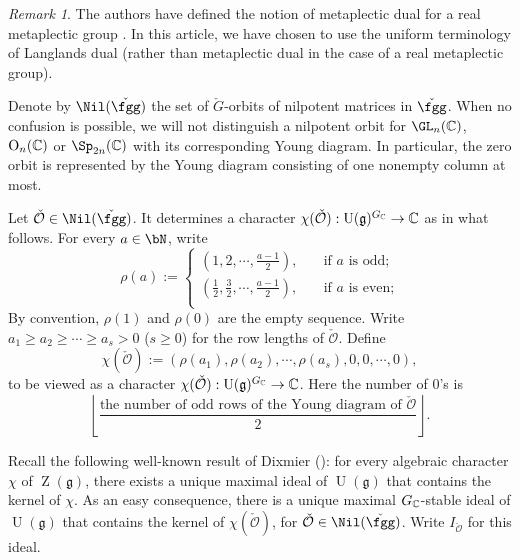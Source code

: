 \documentclass[12pt,a4paper]{amsart}
\newcommand{\CO}{{\mathcal {O}}}
\newcommand{\oO}{\operatorname{O}}
\newcommand{\oZ}{\operatorname{Z}}
\newcommand{\oU}{\operatorname{U}}
\newcommand{\g}{\mathfrak g}
\newcommand{\be}{\begin {equation}}
\newcommand{\ee}{\end {equation}}
\numberwithin{equation}{section}
\theoremstyle{remark}
\newtheorem*{remark}{Remark}
\begin{document}
\begin{remark} The authors have defined the notion of metaplectic dual for a real metaplectic group \cite{BMSZ1}. In this article, we have chosen to use the uniform terminology of Langlands dual (rather than metaplectic dual in the case of a real metaplectic group).
\end{remark}

Denote by $\Nil(\check \fgg)$ the set of   $\check G$-orbits  of nilpotent matrices in $\check \fgg$. 
When no confusion is possible, we will not distinguish a nilpotent orbit for $\GL_n(\C)$, $\oO_n(\C)$ or $\Sp_{2n}(\C)$ with its corresponding Young diagram. In particular, the zero orbit is represented by the Young diagram consisting of one nonempty column at most. 

Let  $\check \CO \in \Nil(\check \fgg) $.  It determines a character $\chi(\check \CO): \oU(\g)^{G_\C}\rightarrow \C$ as in what follows. For every  $a\in \bN$, write
\[
  \rho(a):=\left\{ \begin{array}{ll}
                  (1, 2, \cdots, \frac{a-1}{2}), \quad &\textrm{if $a$ is odd;}\\
                    (\frac{1}{2}, \frac{3}{2}, \cdots, \frac{a-1}{2}), \quad &\textrm{if $a$ is even;}\\
                    \end{array}
                 \right.
\]
By convention, $\rho(1)$ and $\rho(0)$ are  the empty sequence.
Write $a_1\geq  a_2\geq \cdots\geq a_s>0$ ($s\geq 0$)  for the row lengths of  $\check \CO$. Define
\be\label{chico}
 \chi(\check \CO):= (\rho( a_1), \rho(a_2),  \cdots, \rho(a_s), 0, 0, \cdots, 0 ),
\ee
to be viewed as a character $\chi(\check \CO): \oU(\g)^{G_\C}\rightarrow \C$.
Here the number of $0$'s is
\[
 \left\lfloor\frac{\textrm{the number of odd rows of the Young diagram of $\check \CO$}}{2}\right\rfloor.
\]


Recall the following well-known result of Dixmier (\cite[Section 3]{Bor}): for every algebraic character $\chi$ of $\oZ(\g)$, there exists a unique maximal ideal of $\oU(\g)$ that contains the kernel of $\chi$. %
As an easy consequence, there is a unique maximal $G_{\mathbb{C}}$-stable ideal of $\oU(\g)$ that contains the kernel of $\chi(\check \CO)$, for $\check \CO \in \Nil(\check \fgg)$. Write $I_{\check \CO}$ for this ideal.
\end{document}
